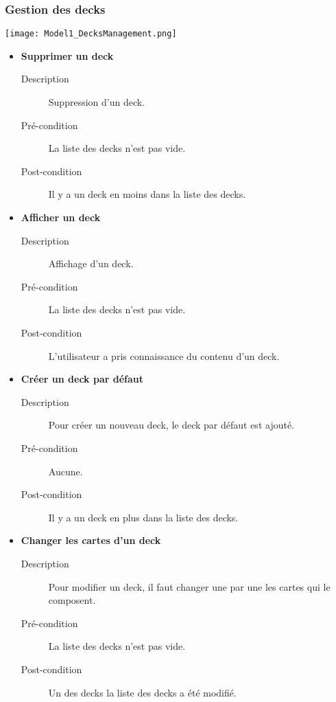 \documentclass{article}
\begin{document}
		\subsubsection{Gestion des decks}
			\begin{center}\texttt{[image: Model1\_DecksManagement.png]}\end{center}
			\begin{itemize}
				\item \textbf{Supprimer un deck}
				\begin{description}
					\item[Description] Suppression d'un deck.
					\item[Pré-condition] La liste des decks n'est pas vide.
					\item[Post-condition] Il y a un deck en moins dans la liste des decks.\\
				\end{description}

				\item \textbf{Afficher un deck}
				\begin{description}
					\item[Description] Affichage d'un deck.
					\item[Pré-condition] La liste des decks n'est pas vide.
					\item[Post-condition] L'utilisateur a pris connaissance du contenu d'un deck.\\
				\end{description}

				\item \textbf{Créer un deck par défaut}
				\begin{description}
					\item[Description] Pour créer un nouveau deck, le deck par défaut est ajouté.
					\item[Pré-condition] Aucune.
					\item[Post-condition] Il y a un deck en plus dans la liste des decks.\\
				\end{description}

				\item \textbf{Changer les cartes d'un deck}
				\begin{description}
					\item[Description] Pour modifier un deck, il faut changer une par une les cartes qui le composent.
					\item[Pré-condition] La liste des decks n'est pas vide.
					\item[Post-condition] Un des decks la liste des decks a été modifié.\\
				\end{description}
			\end{itemize}
\end{document}
